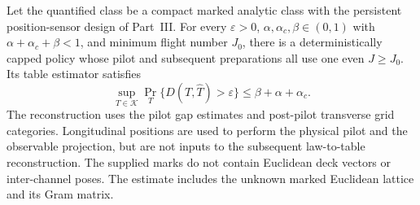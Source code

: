 \begin{corollary}
\label{cor:v47-physical-histograms}
Let the quantified class be a compact marked analytic class with the
persistent position-sensor design of Part~III.  For every $\varepsilon>0$,
$\alpha,\alpha_c,\beta\in(0,1)$ with $\alpha+\alpha_c+\beta<1$, and
minimum flight number $J_0$, there is a deterministically capped policy
whose pilot and subsequent preparations all use one even $J\ge J_0$.
Its table estimator satisfies
\begin{equation}\label{eq:v47-physical-risk}
 \sup_{T\in\mathcal K}\Pr_T\{D(T,\widehat T)>\varepsilon\}
 \le\beta+\alpha+\alpha_c.
\end{equation}
The reconstruction uses the pilot gap estimates and post-pilot transverse
grid categories.  Longitudinal positions are used to perform the physical
pilot and the observable projection, but are not inputs to the subsequent
law-to-table reconstruction.  The supplied marks do not contain Euclidean
deck vectors or inter-channel poses.  The estimate includes the unknown
marked Euclidean lattice and its Gram matrix.
\end{corollary}

